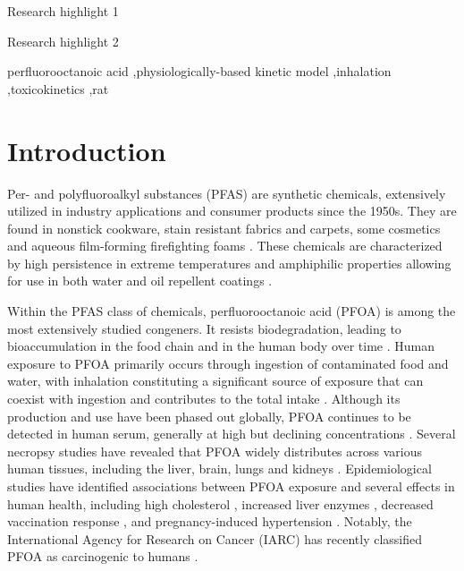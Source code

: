\documentclass[preprint,12pt,authoryear]{elsarticle}
\begin{document}
\begin{frontmatter}
\begin{abstract}
\end{abstract}

\begin{graphicalabstract}
\end{graphicalabstract}

\begin{highlights}
\item Research highlight 1
\item Research highlight 2
\end{highlights}

\begin{keyword}
perfluorooctanoic acid \sep physiologically-based kinetic model \sep  inhalation \sep  toxicokinetics \sep  rat 
\end{keyword}
\end{frontmatter}
\newpage
\section{Introduction}
\label{PFOA_intro}
Per- and polyfluoroalkyl substances (PFAS) are synthetic chemicals, extensively utilized in industry applications and consumer products since the 1950s. They are found in nonstick cookware, stain resistant fabrics and carpets, some cosmetics and aqueous film-forming firefighting foams \citep{gluge_2020}. These chemicals are characterized by high persistence in extreme temperatures and amphiphilic properties allowing for use in both water and oil repellent coatings \citep{cao_2021}. 

Within the PFAS class of chemicals, perfluorooctanoic acid (PFOA) is among the most extensively studied congeners.  It resists biodegradation, leading to bioaccumulation in the food chain and in the human body over time \citep{peritore_2023}. Human exposure to PFOA primarily occurs through ingestion of contaminated food and water, with inhalation constituting a significant source of exposure that can coexist with ingestion and contributes to the total intake \citep{wee_2023}. Although its production and use have been phased out globally, PFOA continues to be detected in human serum, generally at high but declining concentrations \citep{gockener_2020, sonnenberg_2023}. Several necropsy studies have revealed that PFOA widely distributes across various human tissues, including the liver, brain, lungs and kidneys \citep{maestri_2006, perez_2013, nielsen_2024, domingo_2025}. Epidemiological studies have identified associations between PFOA exposure and several effects in human health, including high cholesterol \citep{schlezinger_2021}, increased liver enzymes \citep{rosato_2024}, decreased vaccination response \citep{abraham_2020}, and pregnancy-induced hypertension \citep{avanasi_2016}. Notably, the International Agency for Research on Cancer (IARC) has recently classified PFOA as carcinogenic to humans \citep{iarc_2025}. 
\end{document}
